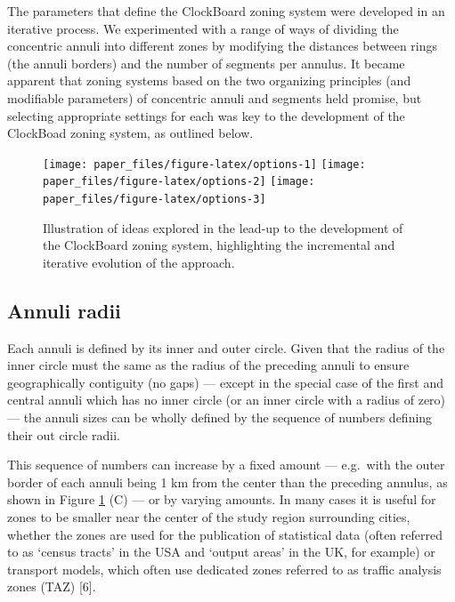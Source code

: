 \documentclass{josis}
\begin{document}
The parameters that define the ClockBoard zoning system were developed in an iterative process.
We experimented with a range of ways of dividing the concentric annuli into different zones by modifying the distances between rings (the annuli borders) and the number of segments per annulus.
It became apparent that zoning systems based on the two organizing principles (and modifiable parameters) of concentric annuli and segments held promise, but selecting appropriate settings for each was key to the development of the ClockBoad zoning system, as outlined below.

\begin{figure}

{\centering \texttt{[image: paper\_files/figure-latex/options-1]} \texttt{[image: paper\_files/figure-latex/options-2]} \texttt{[image: paper\_files/figure-latex/options-3]} 

}

\caption{Illustration of ideas explored in the lead-up to the development of the ClockBoard zoning system, highlighting the incremental and iterative evolution of the approach.}\label{fig:options}
\end{figure}

\hypertarget{annuli-radii}{%
\subsection{Annuli radii}\label{annuli-radii}}

Each annuli is defined by its inner and outer circle.
Given that the radius of the inner circle must the same as the radius of the preceding annuli to ensure geographically contiguity (no gaps) --- except in the special case of the first and central annuli which has no inner circle (or an inner circle with a radius of zero) --- the annuli sizes can be wholly defined by the sequence of numbers defining their out circle radii.

This sequence of numbers can increase by a fixed amount --- e.g.~with the outer border of each annuli being 1 km from the center than the preceding annulus, as shown in Figure \ref{fig:options} (C) --- or by varying amounts.
In many cases it is useful for zones to be smaller near the center of the study region surrounding cities, whether the zones are used for the publication of statistical data (often referred to as `census tracts' in the USA and `output areas' in the UK, for example) or transport models, which often use dedicated zones referred to as traffic analysis zones (TAZ) {[}6{]}.
\end{document}
